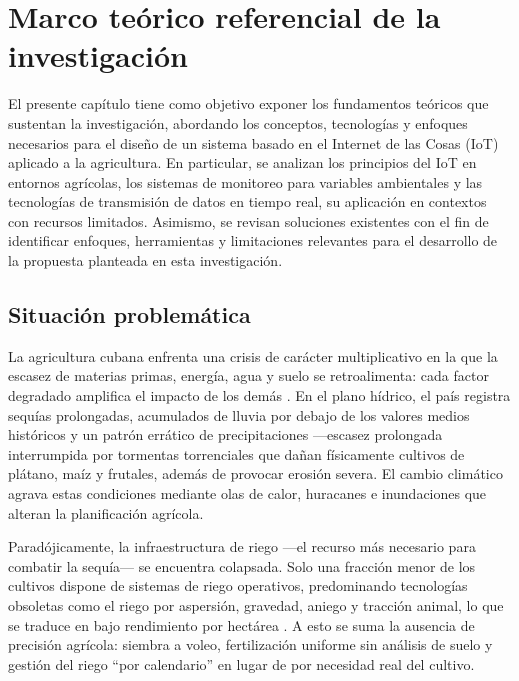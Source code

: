 \chapter{Marco teórico referencial de la investigación}\label{chap:1}

El presente capítulo tiene como objetivo exponer los fundamentos teóricos que sustentan la investigación, abordando los conceptos, tecnologías y enfoques necesarios para el diseño de un sistema basado en el Internet de las Cosas (IoT) aplicado a la agricultura. En particular, se analizan los principios del IoT en entornos agrícolas, los sistemas de monitoreo para variables ambientales y las tecnologías de transmisión de datos en tiempo real, su aplicación en contextos con recursos limitados. Asimismo, se revisan soluciones existentes con el fin de identificar enfoques, herramientas y limitaciones relevantes para el desarrollo de la propuesta planteada en esta investigación.

\section{Situación problemática}\label{sec:situacion}

La agricultura cubana enfrenta una crisis de carácter multiplicativo en la que la escasez de materias primas, energía, agua y suelo se retroalimenta: cada factor degradado amplifica el impacto de los demás \citep{cigg2025}. En el plano hídrico, el país registra sequías prolongadas, acumulados de lluvia por debajo de los valores medios históricos y un patrón errático de precipitaciones ---escasez prolongada interrumpida por tormentas torrenciales que dañan físicamente cultivos de plátano, maíz y frutales, además de provocar erosión severa. El cambio climático agrava estas condiciones mediante olas de calor, huracanes e inundaciones que alteran la planificación agrícola.

Paradójicamente, la infraestructura de riego ---el recurso más necesario para combatir la sequía--- se encuentra colapsada. Solo una fracción menor de los cultivos dispone de sistemas de riego operativos, predominando tecnologías obsoletas como el riego por aspersión, gravedad, aniego y tracción animal, lo que se traduce en bajo rendimiento por hectárea \citep{cornelltraccion}. A esto se suma la ausencia de precisión agrícola: siembra a voleo, fertilización uniforme sin análisis de suelo y gestión del riego ``por calendario'' en lugar de por necesidad real del cultivo.

